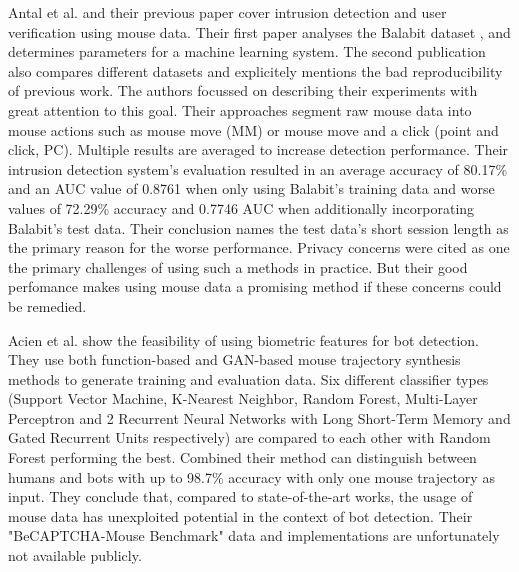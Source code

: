 \documentclass[
    fontsize=12pt,
    headings=small,
    parskip=half,           %
    bibliography=totoc,
    numbers=noenddot,       %
    open=any,               %
    final,                   %
    table
]{scrreprt}
\begin{document}
Antal et al.\cite{9111596} and their previous paper \cite{https://doi.org/10.1049/iet-bmt.2018.5126} cover intrusion detection and user verification using mouse data. Their first paper analyses the Balabit dataset \cite{BALABIT_CHALLENGE}, and determines parameters for a machine learning system. The second publication also compares different datasets and explicitely mentions the bad reproducibility of previous work. The authors focussed on describing their experiments with great attention to this goal. Their approaches segment raw mouse data into mouse actions such as mouse move (MM) or mouse move and a click (point and click, PC). Multiple results are averaged to increase detection performance. Their intrusion detection system's evaluation resulted in an average accuracy of 80.17\% and an AUC value of 0.8761 when only using Balabit's training data and worse values of 72.29\% accuracy and 0.7746 AUC when additionally incorporating Balabit's test data. Their conclusion names the test data's short session length as the primary reason for the worse performance. Privacy concerns were cited as one the primary challenges of using such a methods in practice. But their good perfomance makes using mouse data a promising method if these concerns could be remedied.

Acien et al. \cite{Acien2020BeCAPTCHAMouseSM} show the feasibility of using biometric features for bot detection. They use both function-based and GAN-based mouse trajectory synthesis methods to generate training and evaluation data. Six different classifier types (Support Vector Machine, K-Nearest Neighbor, Random Forest, Multi-Layer Perceptron and 2 Recurrent Neural Networks with Long Short-Term Memory and Gated Recurrent Units respectively) are compared to each other with Random Forest performing the best. Combined their method can distinguish between humans and bots with up to 98.7\% accuracy with only one mouse trajectory as input. They conclude that, compared to state-of-the-art works, the usage of mouse data has unexploited potential in the context of bot detection. Their "BeCAPTCHA-Mouse Benchmark" data and implementations are unfortunately not available publicly.
\end{document}
